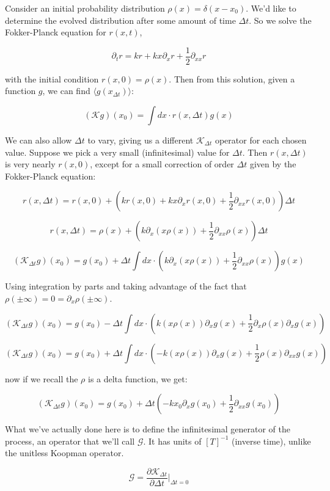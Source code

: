 \documentclass[]{article}
\newcommand{\p}[1]{\left( #1 \right)}
\newcommand{\parfr}[2]{\frac{\partial #1}{\partial #2}}
\newcommand{\Kp}{\mathcal{K}}
\begin{document}
Consider an initial probability distribution $\rho(x) = \delta(x-x_0)$. We'd like to determine the evolved distribution after some amount of time $\Delta t$. So we solve the Fokker-Planck equation for $r(x, t)$,

$$
\partial_t r = k r + kx \partial_x r + \frac{1}{2} \partial_{xx} r
$$

with the initial condition $r(x, 0) = \rho(x)$. Then from this solution, given a function $g$, we can find $\langle g(x_{\Delta t}) \rangle$:

$$
(\Kp g)(x_0) = \int dx \cdot r(x, \Delta t) g(x)
$$

We can also allow $\Delta t$ to vary, giving us a different $\Kp_{\Delta t}$ operator for each chosen value. Suppose we pick a very small (infinitesimal) value for $\Delta t$. Then $r(x, \Delta t)$ is very nearly $r(x, 0)$, except for a small correction of order $\Delta t$ given by the Fokker-Planck equation:

$$
r(x, \Delta t) = r(x, 0) + \p{kr(x, 0) + kx\partial_x r(x, 0) + \frac{1}{2}\partial_{xx}r(x, 0)}\Delta t
$$

$$
r(x, \Delta t) = \rho(x) + \p{k\partial_x\p{x\rho(x)}
+ \frac{1}{2}\partial_{xx}\rho(x)}\Delta t
$$

$$
(\Kp_{\Delta t} g)(x_0) = g(x_0) +
\Delta t \int dx \cdot
\p{k\partial_x\p{x\rho(x)}
	+ \frac{1}{2}\partial_{xx}\rho(x)}
g(x)
$$

Using integration by parts and taking advantage of the fact that $\rho(\pm\infty) = 0 =\partial_x \rho(\pm\infty)$.

$$
(\Kp_{\Delta t} g)(x_0) = g(x_0) -
\Delta t \int dx \cdot
\p{k\p{x\rho(x)} \partial_x g(x)
+ \frac{1}{2}\partial_{x}\rho(x)\partial_x g(x)}
$$

$$
(\Kp_{\Delta t} g)(x_0) = g(x_0) +
\Delta t \int dx \cdot
\p{-k\p{x\rho(x)} \partial_x g(x)
	+ \frac{1}{2}\rho(x)\partial_{xx} g(x)}
$$

now if we recall the $\rho$ is a delta function, we get:

$$
(\Kp_{\Delta t} g)(x_0) = g(x_0) +
\Delta t \p{-kx_0 \partial_x g(x_0)
	+ \frac{1}{2}\partial_{xx} g(x_0)}
$$

What we've actually done here is to define the infinitesimal generator of the process, an operator that we'll call $\mathcal{G}$. It has units of $[T]^{-1}$ (inverse time), unlike the unitless Koopman operator.

$$
\mathcal{G} = \parfr{\Kp_{\Delta t}}{\Delta t} \Big\vert_{\Delta t = 0}
$$
\end{document}
